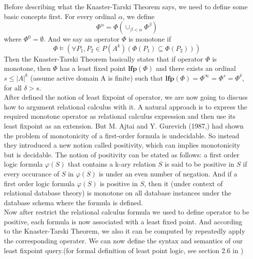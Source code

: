 Before describing what the Knaster-Tarski Theorem says, we need to define some basic concepts first. For every ordinal $\alpha$, we define 
$$\Phi^{\alpha}=\Phi(\cup_{\beta<\alpha} \Phi^{\beta})$$
where $\Phi^0=\emptyset$. And we say an operator $\Phi$ is monotone if 
$$\Phi\models(\forall P_1,P_2\in P(A^k)(\Phi(P_1)\subseteq\Phi(P_2)))$$
Then the Knaster-Tarski Theorem basically states that if operator $\Phi$ is monotone, then $\Phi$ has a least fixed point $\textbf{lfp}(\Phi)$ and there exists an ordinal $s\leq |A|^k$ (assume active domain A is finite) such that $\textbf{lfp}(\Phi)=\Phi^{\infty}=\Phi^s=\Phi^{\delta}$, for all $\delta > s$.\\
After defined the notion of least fixpoint of operator, we are now going to discuss how to argument relational calculus with it. A natural approach is to express the required monotone operator as relational calculus expression and then use its least fixpoint as an extension. But M. Ajtai and Y. Gurevich (1987,\cite{Ajtai}) had shown the problem of monotonicity of a first-order formula is undecidable. So instead they introduced a new notion called positivity, which can implies monotonicity but is decidable. The notion of positivity can be stated as follows: a first order logic formula $\varphi(S)$ that contains a k-ary relation $S$ is said to be positive in $S$ if every occurance of $S$ in $\varphi(S)$ is under an even number of negation. And if a first order logic formula $\varphi(S)$ is positive in $S$, then it (under context of relational database theory) is monotone on all database instances under the database schema where the formula is defined.\\ 
Now after restrict the relational calculus formula we used to define operator to be positive, each formula is now associated with a least fixed point. And according to the Knaster-Tarski Theorem, we also it can be computed by repeatedly apply the corresponding operater. We can now define the syntax and semantics of our least fixpoint query.(for formal definition of least point logic, see section 2.6 in \cite{kolaitis1})\\

